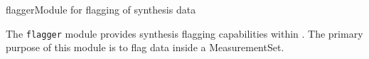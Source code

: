 
\begin{ahmodule}{flagger}{Module for flagging of synthesis data}

\begin{ahdescription}

The {\tt flagger} module provides synthesis flagging capabilities
within \aipspp. The primary purpose of this module is to flag data
inside a MeasurementSet.
\end{ahdescription}



\end{ahmodule}
